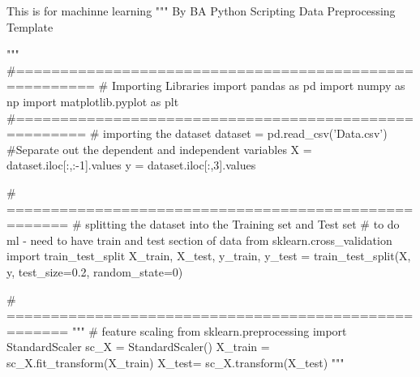 
This is for machinne learning
"""
By BA
Python Scripting
Data Preprocessing Template 

"""
#=======================================================
# Importing Libraries
import pandas as pd
import numpy as np
import matplotlib.pyplot as plt
#======================================================
# importing the dataset
dataset = pd.read_csv('Data.csv')
#Separate out the dependent and independent variables
X = dataset.iloc[:,:-1].values
y = dataset.iloc[:,3].values

# =====================================================
# splitting the dataset into the Training set and Test set
# to do ml - need to have train  and test section of data
from sklearn.cross_validation import train_test_split
X_train, X_test, y_train, y_test = train_test_split(X, y, test_size=0.2, random_state=0)

# =====================================================
"""
# feature scaling
from sklearn.preprocessing import StandardScaler
sc_X = StandardScaler()
X_train = sc_X.fit_transform(X_train)
X_test= sc_X.transform(X_test)
"""
